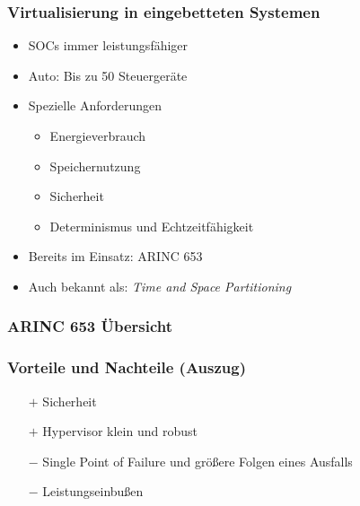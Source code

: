 \documentclass[]{beamer}
\newcommand{\inputImage}[1]{}
\begin{document}
\begin{frame}
\frametitle{Virtualisierung in eingebetteten Systemen}
    \begin{itemize}
        \item SOCs immer leistungsfähiger
        \item Auto: Bis zu 50 Steuergeräte
        \item Spezielle Anforderungen
        \begin{itemize}
            \item Energieverbrauch
            \item Speichernutzung
            \item Sicherheit
            \item Determinismus und Echtzeitfähigkeit
        \end{itemize}
        \item Bereits im Einsatz: ARINC 653
        \item Auch bekannt als: \emph{Time and Space Partitioning}
    \end{itemize}
\end{frame}


\begin{frame}
\frametitle{ARINC 653 Übersicht}
    \begin{figure}[ht]
        \centering
        \resizebox{0.65\linewidth}{!}{\inputImage{arinc653.dia}}
        \label{fig:arinc_653}
    \end{figure}
\end{frame}



\begin{frame}
\frametitle{Vorteile und Nachteile (Auszug)}
    \begin{itemize}
        \item[$ + $] Sicherheit
        \item[$ + $] Hypervisor klein und robust

        \item[$ - $] Single Point of Failure und größere Folgen eines Ausfalls
        \item[$ - $] Leistungseinbußen
    \end{itemize}
\end{frame}
\end{document}
